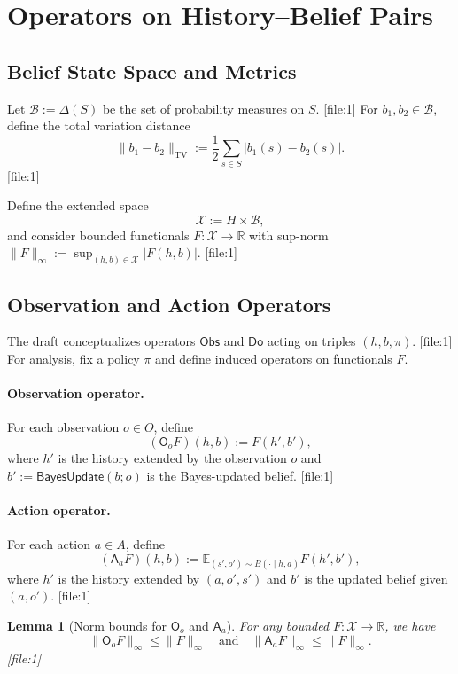 \documentclass[11pt,a4paper]{article}
\theoremstyle{tealstyle}
\newtheorem{lemma}[theorem]{Lemma}
\theoremstyle{definition}
\begin{document}
\section{Operators on History–Belief Pairs}

\subsection{Belief State Space and Metrics}

Let \(\mathcal{B} := \Delta(S)\) be the set of probability measures on \(S\). [file:1] For \(b_1, b_2 \in \mathcal{B}\), define the total variation distance
\[
  \|b_1 - b_2\|_{\text{TV}} := \frac{1}{2} \sum_{s \in S} |b_1(s) - b_2(s)|.
\] [file:1]

Define the extended space
\[
  \mathcal{X} := H \times \mathcal{B},
\]
and consider bounded functionals \(F : \mathcal{X} \to \mathbb{R}\) with sup-norm \(\|F\|_\infty := \sup_{(h,b)\in\mathcal{X}} |F(h,b)|\). [file:1]

\subsection{Observation and Action Operators}

The draft conceptualizes operators \(\mathsf{Obs}\) and \(\mathsf{Do}\) acting on triples \((h,b,\pi)\). [file:1] For analysis, fix a policy \(\pi\) and define induced operators on functionals \(F\).

\paragraph{Observation operator.} For each observation \(o \in O\), define
\[
  (\mathsf{O}_o F)(h,b) := F(h', b'),
\]
where \(h'\) is the history extended by the observation \(o\) and \(b' := \mathsf{BayesUpdate}(b; o)\) is the Bayes-updated belief. [file:1]

\paragraph{Action operator.} For each action \(a \in A\), define
\[
  (\mathsf{A}_a F)(h,b) := \mathbb{E}_{(s',o') \sim B(\cdot \mid h,a)} F(h', b'),
\]
where \(h'\) is the history extended by \((a,o',s')\) and \(b'\) is the updated belief given \((a,o')\). [file:1]

\begin{lemma}[Norm bounds for \(\mathsf{O}_o\) and \(\mathsf{A}_a\)]
For any bounded \(F : \mathcal{X} \to \mathbb{R}\), we have
\[
  \|\mathsf{O}_o F\|_\infty \le \|F\|_\infty \quad \text{and} \quad
  \|\mathsf{A}_a F\|_\infty \le \|F\|_\infty.
\] [file:1]
\end{lemma}
\end{document}
